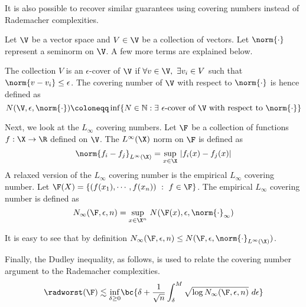     It is also possible to recover similar guarantees using covering
    numbers instead of Rademacher complexities.
    \begin{example} \label{ex:cov_num}
      Let $\V$ be a vector space and $V\in\V$ be a collection of
      vectors. Let $\norm{\cdot}$ represent a seminorm on $\V$. A few
      more terms are explained below.

      The collection $V$ is an $\epsilon$-cover of $\V$ if
      $\forall v\in\V,~\exists v_i\in V$ such that
      $\norm{v - v_i}\le \epsilon$. The covering number of $\V$ with
      respect to $\norm{\cdot}$ is hence defined as
      \[N(\V,\epsilon,\norm{\cdot})\coloneqq
        \inf\{N\in\mathbb{N} : \exists~\epsilon\text{-cover of
          $\V$ with respect to }\norm{\cdot} \}\]
    
      Next, we look at the $L_\infty$ covering numbers. Let $\F$ be a
      collection of functions $f:\X\rightarrow\R$ defined on $\V$. The
      $L^{\infty}(\X)$ norm on $\F$ is defined as
      \[\norm{f_i-f_j}_{L^{\infty}(\X)} =
        \underset{x\in\X}{\sup}~|f_i(x) - f_j(x)|\] A relaxed
      version of the $L_\infty$ covering number is the empirical
      $L_\infty$ covering number. Let
      $\F(X) = \{(f(x_1),\cdots,f(x_n))~:~f\in\F\}$. The empirical
      $L_\infty$ covering number is defined as
      \[N_{\infty}(\F,\epsilon, n) =
        \underset{x\in\X^n}{\sup}~N(\F(x),\epsilon,\norm{\cdot}_{\infty})\]
    
      It is easy to see that by definition
      $N_{\infty}(\F,\epsilon, n) \le N(\F, \epsilon,
      \norm{\cdot}_{L^{\infty}(\X)})$.

      Finally, the Dudley inequality, as follows, is used to relate
      the covering number argument to the Rademacher complexities.
      \[\radworst(\F) \lesssim\underset{\delta\ge 0}{\inf}
        \bc{\delta +
          \frac{1}{\sqrt{n}}\int_{\delta}^M\sqrt{\log N_{\infty}(\F,\epsilon,n)}~d\epsilon}\]


\end{example}
